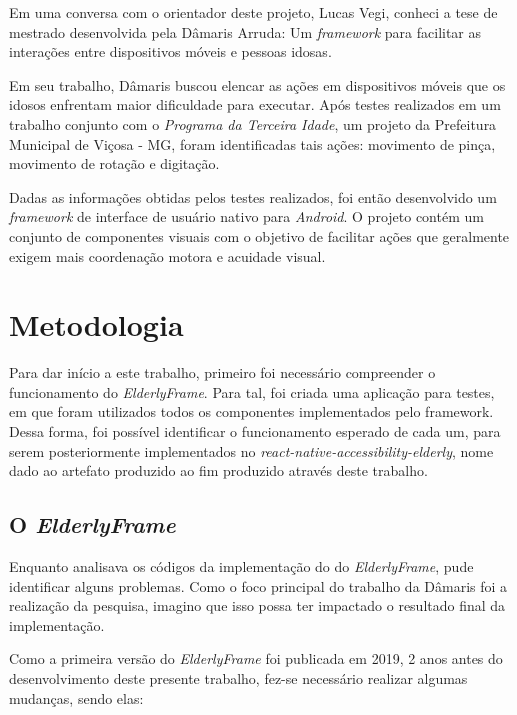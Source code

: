 \documentclass[
	12pt,				    %
	openright,			    %
	oneside,			    %
	a4paper,			    %
    sumario=tradicional,    %
	english,			    %
	brazil,				    %
	]{abntex2}              %
\begin{document}
Em uma conversa com o orientador deste projeto, Lucas Vegi, conheci a tese de mestrado desenvolvida pela Dâmaris Arruda: Um \textit{framework} para facilitar as interações entre dispositivos móveis e pessoas idosas\cite{tesedamaris}.

\par

Em seu trabalho, Dâmaris buscou elencar as ações em dispositivos móveis que os idosos enfrentam maior dificuldade para executar. Após testes realizados em um trabalho conjunto com o \emph{Programa da Terceira Idade}, um projeto da Prefeitura Municipal de Viçosa - MG, foram identificadas tais ações: movimento de pinça, movimento de rotação e digitação.

\par

Dadas as informações obtidas pelos testes realizados, foi então desenvolvido um \textit{framework} de interface de usuário nativo para \textit{Android}. O projeto contém um conjunto de componentes visuais com o objetivo de facilitar ações que geralmente exigem mais coordenação motora e acuidade visual.

\chapter{Metodologia}\label{sec:metodologia}

Para dar início a este trabalho, primeiro foi necessário compreender o funcionamento do \textit{ElderlyFrame}. Para tal, foi criada uma aplicação para testes, em que foram utilizados todos os componentes implementados pelo framework. Dessa forma, foi possível identificar o funcionamento esperado de cada um, para serem posteriormente implementados no \textit{react-native-accessibility-elderly}, nome dado ao artefato produzido ao fim produzido através deste trabalho.

\section{O \textit{ElderlyFrame}}

Enquanto analisava os códigos da implementação do do \textit{ElderlyFrame}, pude identificar alguns problemas. Como o foco principal do trabalho da Dâmaris foi a realização da pesquisa, imagino que isso possa ter impactado o resultado final da implementação.

Como a primeira versão do \textit{ElderlyFrame} foi publicada em 2019, 2 anos antes do desenvolvimento deste presente trabalho, fez-se necessário realizar algumas mudanças, sendo elas:
\end{document}
